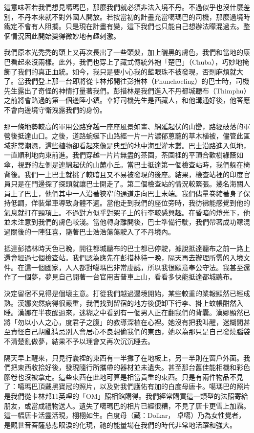 這意味著若我們想見噶瑪巴，那麼我們就必須非法入境不丹。不過似乎也沒什麼差別，不丹本來就不對外國人開放。若按當初的計畫充當噶瑪巴的司機，那麼過境時鐵定不會有人阻攔。只是現在計畫有變，這下我們也只能自己想辦法矇混過去。整個情況因此開始變得微妙地有趣刺激。

我們原本光禿禿的頭上又再次長出了一些頭髮，加上曬黑的膚色，我們和當地的康巴看起來沒兩樣。此外，我們也穿上了藏式傳統外袍「楚巴」（Chuba），巧妙地掩飾了我們的真正血統。如今，我只是要小心我的藍眼珠不被發現，否則麻煩就大了。當我們登上那一台即將從卡林邦開往彭措林（Phunchoeling）的巴士時，司機先生露出了奇怪的神情打量著我們。彭措林是我們進入不丹都城聽布（Thimphu）之前將會路過的第一個邊陲小鎮。幸好司機先生是西藏人，和他溝通好後，他答應不會向邊境守衛洩露我們的身份。

那一條地勢較高的軍用公路穿越一座座風景如畫、綿延起伏的山巒，路經破落的軍營後抵達山口。之後，道路蜿蜒下山路經一片一片濃郁蔥蘢的草木植被，儘管此區域非常潮濕，這些植物卻看起來像是典型的地中海型灌木叢。巴士沿路進入低地，一直順利地向東前進。我們穿越一片片無盡的茶園，茶園裡的平頂合歡樹綠蔭如傘，視野的左側是連綿起伏的山麓小丘。當巴士抵達第一個檢查站時，我們躲在椅背後。我們一上巴士就挑了較暗且又不易被發現的後座。結果，檢查站裡的印度官員只是在門邊探了探頭就讓巴士開走了。第二個檢查站的情況較緊張。幾名海關人員上了巴士，他們其中一人沿著狹窄的通道走向巴士末端。我們儘量卷縮著身子保持低調，佯裝暈車導致身體不適。當他走到我們的座位旁時，我彷彿能感覺到他的氣息就打在頸項上。不過對方似乎對架子上的行李較感興趣。在昏暗的燈光下，他並未注意到我們的膚色較淺。當他轉身離開後，巴士準備行駛，我們帶著成功矇混過關後的一陣狂喜，隨著巴士浩浩蕩蕩駛入了不丹境內。

抵達彭措林時天色已晚，開往都城聽布的巴士都已停駛，據說抵達聽布之前一路上還會經過七個檢查站。我們認為應先在彭措林待一晚，隔天再去辦理所需的入境文件。在這一個國家，人人都對噶瑪巴非常虔誠，所以我很願意奉公守法。我甚至還作了一個夢，夢見自己開著一台官用吉普車上山，看看多快能抵達都城聽布。

決定留宿不見得是個壞主意。打從我們越過邊境開始，某些較重的業報顯然已經成熟。漢娜突然病得很嚴重，我們找到留宿的地方後便卸下行李、掛上蚊帳酣然入睡。漢娜在半夜醒過來，迷糊之中看到有一個男人正在翻我們的背囊。漢娜顯然已將「勿以小人之心，度君子之腹」的教導深植在心裡。她沒有把我叫醒，迷糊間甚至責怪自己胡亂猜忌別人會居心不良想偷我們的東西，她以為那只是自己發燒腦袋不清楚亂做夢，結果不予以理會又再次沉沉睡去。

隔天早上醒來，只見行囊裡的東西有一半攤了在地板上，另一半則在窗戶外面。我們把東西收拾好後，發現隨行所攜帶的器材並未遺失。甚至那台舊佳能相機和彩色膠卷也沒被拿走。這些東西在此地可算是相當貴重的東西。只是有兩件物品不見了：噶瑪巴頂戴黑寶冠的照片，以及對我們護佑有加的白度母唐卡。噶瑪巴的照片是我們從卡林邦11英哩的「OM」照相館購得。我們經常購買這一類型的法照寄給朋友，或當成禮物送人。遺失了噶瑪巴的相片已經很糟，不見了唐卡更雪上加霜。這一幅唐卡活靈活現，栩栩如生。白度母（藏：Dolkar，
卓噶）乃為女性覺者，是觀世音菩薩慈悲眼淚的化現，祂的能量場在我們的時代非常地活躍和強大。

